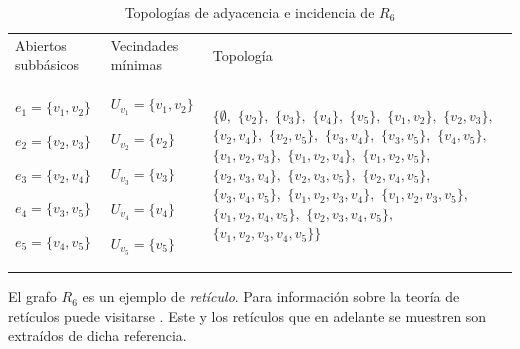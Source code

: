 \begin{table}[p]
\begin{tabular}{@{}>{\centering\arraybackslash}m{}>{\centering\arraybackslash}m{}>{\centering\arraybackslash}m{}@{}}
      \hline
      \multicolumn{3}{c}{\textbf{Topología de incidencia}} \\
      \hline
      Abiertos subbásicos & Vecindades mínimas & Topología \\
      \hline
         ${e_{1}=\{v_1,v_2\}}$\par
         ${e_{2}=\{v_2,v_3\}}$\par
         ${e_{3}=\{v_2,v_4\}}$\par
         ${e_{4}=\{v_3,v_5\}}$\par
         ${e_{5}=\{v_4,v_5\}}$
      &
         ${U_{v_1}=\{v_1,v_2\}}$\par
         ${U_{v_2}=\{v_2\}}$\par
         ${U_{v_3}=\{v_3\}}$\par
         ${U_{v_4}=\{v_4\}}$\par
         ${U_{v_5}=\{v_5\}}$
      &
         $\{\emptyset,$ $\{v_2\},$ $\{v_3\},$ $\{v_4\},$ $\{v_5\},$ $\{v_1,v_2\},$ $\{v_2,v_3\},$ $\{v_2,v_4\},$ $\{v_2,v_5\},$ $\{v_3,v_4\},$ $\{v_3,v_5\},$ $\{v_4,v_5\},$ $\{v_1,v_2,v_3\},$ $\{v_1,v_2,v_4\},$ $\{v_1,v_2,v_5\},$ $\{v_2,v_3,v_4\},$ $\{v_2,v_3,v_5\},$ $\{v_2,v_4,v_5\},$ $\{v_3,v_4,v_5\},$ $\{v_1,v_2,v_3,v_4\},$ $\{v_1,v_2,v_3,v_5\},$ $\{v_1,v_2,v_4,v_5\},$ $\{v_2,v_3,v_4,v_5\},$ $\{v_1,v_2,v_3,v_4,v_5\}\}$ \\[6pt]
      \hline
   \end{tabular}
   \caption{Topologías de adyacencia e incidencia de $R_6$}
   \label{tab:topologias_R_6}
   \vspace{2em}
   \begin{minipage}{\textwidth}
      \normalsize
      El grafo $R_6$ es un ejemplo de \textit{retículo}. Para información sobre la teoría de retículos puede visitarse \cite{acosta2016}. Este y los retículos que en adelante se muestren son extraídos de dicha referencia.
   \end{minipage}
\end{table}
